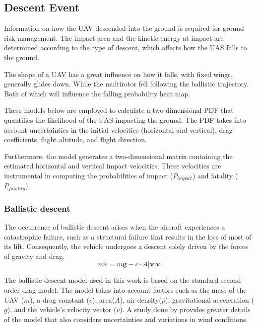 \documentclass[12pt]{report}
\begin{document}
        \subsection{Descent Event}\label{sec:descent_events} Information on how the UAV descended into the ground is
        required for ground risk management. The impact area and the kinetic energy at impact are determined according
        to the type of descent, which affects how the UAS falls to the ground. 
            
        The shape of a UAV has a great influence on how it falls, with fixed wings, generally glides down. While the
        multirotor fell following the ballistic trajectory. Both of which will influence the falling probability heat
        map. 
            
        These models below are employed to calculate a two-dimensional PDF that quantifies the likelihood of the UAS
        impacting the ground. The PDF takes into account uncertainties in the initial velocities (horizontal and
        vertical), drag coefficients, flight altitude, and flight direction. 
            
        Furthermore, the model generates a two-dimensional matrix containing the estimated horizontal and vertical
        impact velocities. These velocities are instrumental in computing the probabilities of impact (\(P_{impact}\))
        and fatality (\(P_{fatality}\)).

        \subsubsection{Ballistic descent}
        The occurrence of ballistic descent arises when the aircraft experiences a catastrophic failure, such as a
        structural failure that results in the loss of most of its lift. Consequently, the vehicle undergoes a descent
        solely driven by the forces of gravity and drag.
        \begin{equation}
             m\dot{v} = m \mathbf{g} - c \cdot A \lvert \mathbf{v} \rvert \mathbf{v}
        \end{equation}
        
        The ballistic descent model used in this work is based on the standard second-order drag model. The model takes
        into account factors such as the mass of the UAV (\(m\)), a drag constant (\(c\)), area(\(A\)), air
        density(\(\rho\)), gravitational acceleration (\(g\)), and the vehicle's velocity vector (\(v\)). A study done by
        \cite{cour-harbo_ground_2020} provides greater details of the model that also considers uncertainties and variations in wind conditions.
\end{document}
